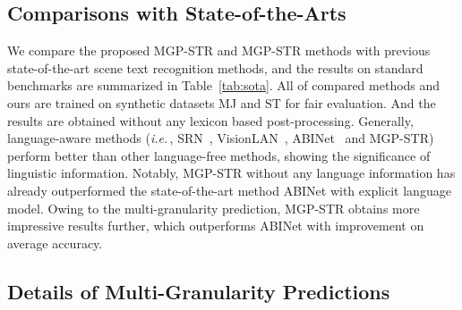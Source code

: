 \documentclass[runningheads]{llncs}
\def\ie{\emph{i.e.}\,}
\begin{document}
\subsection{Comparisons with State-of-the-Arts} 
\label{Sec:sota}
We compare the proposed MGP-STR and MGP-STR methods with previous state-of-the-art scene text recognition methods, and the results on  standard benchmarks  are summarized in Table~\ref{tab:sota}. All of compared methods and ours are trained on synthetic datasets MJ and ST for fair evaluation. And the results are obtained without any lexicon based post-processing. Generally, language-aware methods (\ie, SRN~\cite{SRN}, VisionLAN~\cite{vlan}, ABINet~\cite{ABInet} and MGP-STR) perform better than other language-free methods, showing the significance of linguistic information. Notably, MGP-STR without any language information has already outperformed the state-of-the-art method ABINet with explicit language model. Owing to the multi-granularity prediction, MGP-STR obtains more impressive results further, which outperforms ABINet with  improvement on average accuracy. 

\subsection{Details of Multi-Granularity Predictions}  \label{Sec:fa}
\end{document}
